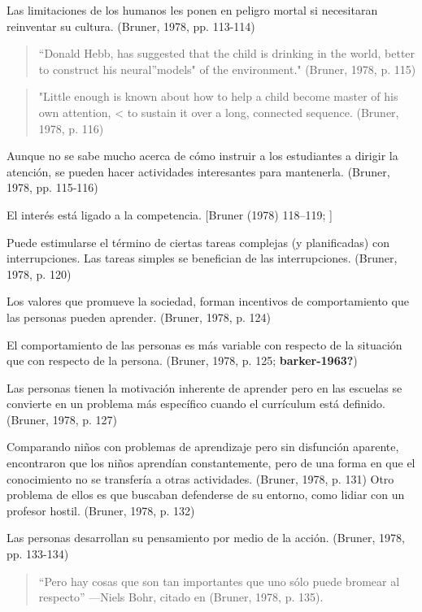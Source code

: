 \documentclass[
  12,
]{scrartcl}
\begin{document}
Las limitaciones de los humanos les ponen en peligro mortal si
necesitaran reinventar su cultura. (Bruner, 1978, pp. 113-114)

\begin{quote}
``Donald Hebb, has suggested that the child is drinking in the world,
better to construct his neural''models" of the environment." (Bruner,
1978, p. 115)
\end{quote}

\begin{quote}
"Little enough is known about how to help a child become master of his
own attention, \textless{} to sustain it over a long, connected
sequence. (Bruner, 1978, p. 116)
\end{quote}

Aunque no se sabe mucho acerca de cómo instruir a los estudiantes a
dirigir la atención, se pueden hacer actividades interesantes para
mantenerla. (Bruner, 1978, pp. 115-116)

El interés está ligado a la competencia. {[}Bruner (1978) 118--119; {]}

Puede estimularse el término de ciertas tareas complejas (y
planificadas) con interrupciones. Las tareas simples se benefician de
las interrupciones. (Bruner, 1978, p. 120)

Los valores que promueve la sociedad, forman incentivos de
comportamiento que las personas pueden aprender. (Bruner, 1978, p. 124)

El comportamiento de las personas es más variable con respecto de la
situación que con respecto de la persona. (Bruner, 1978, p. 125;
\textbf{barker-1963?})

Las personas tienen la motivación inherente de aprender pero en las
escuelas se convierte en un problema más específico cuando el currículum
está definido. (Bruner, 1978, p. 127)

Comparando niños con problemas de aprendizaje pero sin disfunción
aparente, encontraron que los niños aprendían constantemente, pero de
una forma en que el conocimiento no se transfería a otras actividades.
(Bruner, 1978, p. 131) Otro problema de ellos es que buscaban defenderse
de su entorno, como lidiar con un profesor hostil. (Bruner, 1978, p.
132)

Las personas desarrollan su pensamiento por medio de la acción. (Bruner,
1978, pp. 133-134)

\begin{quote}
``Pero hay cosas que son tan importantes que uno sólo puede bromear al
respecto'' ---Niels Bohr, citado en (Bruner, 1978, p. 135).
\end{quote}
\end{document}

